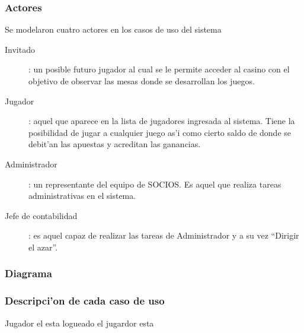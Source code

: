 \subsubsection{Actores}
Se modelaron cuatro actores en los casos de uso del sistema

\begin{description}
\item[Invitado]: un posible futuro jugador al cual se le permite acceder al casino con el objetivo de observar las mesas donde se desarrollan los juegos.
\item[Jugador]: aquel que aparece en la lista de jugadores ingresada al sistema. Tiene la posibilidad de jugar a cualquier juego as'i como cierto saldo de donde se debit'an las apuestas y acreditan las ganancias.
\item[Administrador]: un representante del equipo de SOCIOS. Es aquel que realiza tareas administrativas en el sistema.
\item[Jefe de contabilidad]: es aquel capaz de realizar las tareas de Administrador y a su vez ``Dirigir el azar''.
\end{description}



\subsubsection{Diagrama}


\subsubsection{Descripci'on de cada caso de uso}

 {Jugador} {} {el esta logueado } { el jugardor esta }

